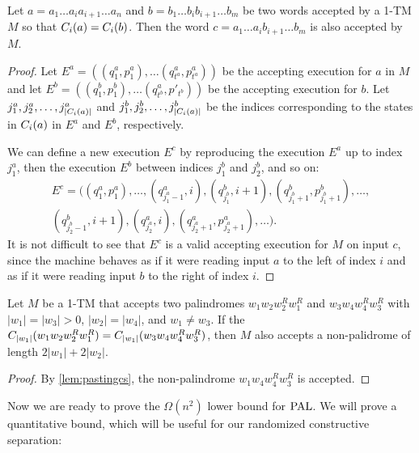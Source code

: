 \begin{lemma}
    \label{lem:pastingcs}
    Let $a = a_1\ldots a_i a_{i+1} \ldots a_n$ and $b = b_1 \ldots b_i b_{i+1} \ldots b_m$ 
    be two words accepted by a 1-TM $M$ so that $C_i(a) = C_i(b)$.
    Then the word  $c = a_1\ldots a_i b_{i+1} \ldots b_m$ is also accepted by $M$.
\end{lemma}
\begin{proof}
Let $E^a = ((q^a_1, p^a_1), \ldots (q^a_{t^a}, p^a_{t^a}))$ be the accepting execution for $a$ in $M$ and let
$E^b = ((q^b_1, p^b_1), \ldots (q^a_{t^b}, p'_{t^b}))$ be the accepting execution for $b$. 
Let $j^a_1, j^a_2, \ldots, j^a_{|C_i(a)|}$ and $j^b_1, j^b_2, \ldots, j^b_{|C_i(a)|}$ be the indices
corresponding to the states in $C_i(a)$ in $E^a$ and $E^b$, respectively.

We can define a new execution $E^c$ by reproducing the execution $E^a$ up to index $j^a_1$, then the execution
$E^b$ between indices $j^b_1$ and $j^b_2$, and so on:
\begin{multline*}
E^c = ((q^a_1, p^a_1), \ldots, (q^a_{j^a_1-1}, i), (q^b_{j^b_1}, i+1), (q^b_{j^b_1+1}, p^b_{j^b_1+1}), \ldots, \\
(q^b_{j^b_2-1}, i+1), (q^a_{j^a_2}, i), (q^a_{j^a_2+1}, p^a_{j^a_2+1}), \ldots ).
\end{multline*}
It is not difficult to see that $E^c$ is a 
valid accepting execution for $M$ on input $c$, since the machine behaves as if it were reading input $a$ to the left
of index $i$ and as if it were reading input $b$ to the right of index $i$. 

\end{proof}

\begin{corollary}
    \label{cor:crosscollision}
    Let $M$ be a 1-TM that accepts two palindromes $w_1 w_2 w_2^R w_1^R$ and
    $w_3 w_4 w_4^R w_3^R$ with $|w_1| = |w_3| > 0$, $|w_2| = |w_4|$, and $w_1 \neq w_3$. 
    If the $C_{|w_1|}(w_1 w_2 w_2^R w_1^R) = C_{|w_1|}(w_3 w_4 w_4^R w_3^R)$, 
    then $M$ also accepts a non-palidrome of length $2|w_1| + 2|w_2|$.
\end{corollary}
\begin{proof}
By \cref{lem:pastingcs}, the non-palindrome $w_1 w_4 w_4^R w_3^R$ is accepted. 
\end{proof}

Now we are ready to prove the $\Omega(n^2)$ lower bound for $\mathrm{PAL}$. We will prove a quantitative
bound, which will be useful for our randomized constructive separation:

